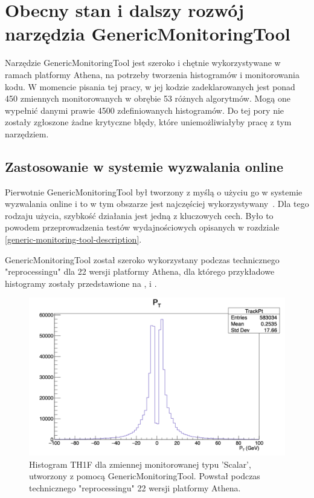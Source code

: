 \section{Obecny stan i dalszy rozwój narzędzia GenericMonitoringTool}
Narzędzie GenericMonitoringTool jest szeroko i chętnie wykorzystywane w ramach platformy Athena, na potrzeby tworzenia histogramów i monitorowania kodu.
W momencie pisania tej pracy, w jej kodzie zadeklarowanych jest ponad 450 zmiennych monitorowanych w obrębie 53 różnych algorytmów. 
Mogą one wypełnić danymi prawie 4500 zdefiniowanych histogramów.
Do tej pory nie zostały zgłoszone żadne krytyczne błędy, które uniemożliwiałyby pracę z tym narzędziem.

\subsection{Zastosowanie w systemie wyzwalania online}
Pierwotnie GenericMonitoringTool był tworzony z myślą o użyciu go w systemie wyzwalania online i to w tym obszarze jest najczęściej wykorzystywany~\cite{online-monitoring-guide}. 
Dla tego rodzaju użycia, szybkość działania jest jedną z kluczowych cech. 
Było to powodem przeprowadzenia testów wydajnościowych opisanych w rozdziale \ref{generic-monitoring-tool-description}.

GenericMonitoringTool został szeroko wykorzystany podczas technicznego "reprocessingu" dla 22 wersji platformy Athena, dla którego przykładowe histogramy zostały przedstawione na ,  i .

\begin{figure}[!ht]
\centering
\includegraphics[width=1\textwidth]{img/histogram_TH1.png}
\caption{
Histogram TH1F dla zmiennej monitorowanej typu 'Scalar', utworzony z pomocą GenericMonitoringTool. Powstał podczas technicznego "reprocessingu" 22 wersji platformy Athena.
}
\label{fig:athena:histogram_TH1}
\end{figure}

